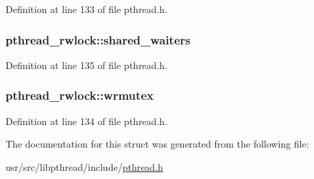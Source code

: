 Definition at line 133 of file pthread.\+h.

\hypertarget{structpthread__rwlock_a513e968cb2dea01c044a3304c26b1d07}{
\subsubsection[{shared\+\_\+waiters}]{ pthread\+\_\+rwlock\+::shared\+\_\+waiters}}\label{structpthread__rwlock_a513e968cb2dea01c044a3304c26b1d07}


Definition at line 135 of file pthread.\+h.

\hypertarget{structpthread__rwlock_acebaf123f0d451e8aa6e7734c6bcca5b}{
\subsubsection[{wrmutex}]{ pthread\+\_\+rwlock\+::wrmutex}}\label{structpthread__rwlock_acebaf123f0d451e8aa6e7734c6bcca5b}


Definition at line 134 of file pthread.\+h.



The documentation for this struct was generated from the following file\+:\begin{DoxyCompactItemize}
\item 
usr/src/libpthread/include/\hyperlink{pthread_8h}{pthread.\+h}\end{DoxyCompactItemize}
